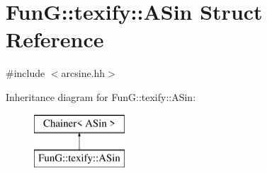 \hypertarget{structFunG_1_1texify_1_1ASin}{\section{Fun\-G\-:\-:texify\-:\-:A\-Sin Struct Reference}
\label{structFunG_1_1texify_1_1ASin}
}


{\ttfamily \#include $<$arcsine.\-hh$>$}

Inheritance diagram for Fun\-G\-:\-:texify\-:\-:A\-Sin\-:\begin{figure}[H]
\begin{center}
\leavevmode
\includegraphics[height=2.000000cm]{structFunG_1_1texify_1_1ASin}
\end{center}
\end{figure}
